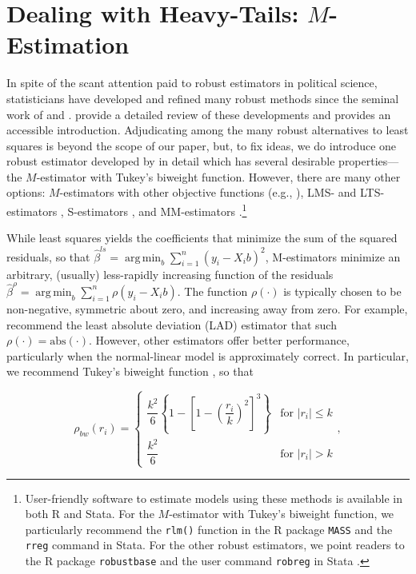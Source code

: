 \documentclass[12pt]{article}
\DeclareMathOperator*{\argmin}{arg\,min}
\begin{document}
\section*{Dealing with Heavy-Tails: $M$-Estimation}

In spite of the scant attention paid to robust estimators in political science, statisticians have developed and refined many robust methods since the seminal work of \cite{Box1953} and \cite{Huber1964}. 
\cite{HuberRonchetti2009} provide a detailed review of these developments and \cite{Anderson2008} provides an accessible introduction. 
Adjudicating among the many robust alternatives to least squares is beyond the scope of our paper, but, to fix ideas, we do introduce one robust estimator developed by \cite{BeatonTukey1974} in detail which has several desirable properties---the $M$-estimator with Tukey's biweight function. 
However, there are many other options: $M$-estimators with other objective functions (e.g., \citealt{Huber1973}), LMS- and LTS-estimators \citep{Rousseeuw1984}, S-estimators \citep{RousseeuwYohai1984}, and MM-estimators \citep{Yohai1987}.\footnote{User-friendly software to estimate models using these methods is available in both R and Stata. For the $M$-estimator with Tukey's biweight function, we particularly recommend the \texttt{rlm()} function in the R package \texttt{MASS} \citep{MASS} and the \texttt{rreg} command in Stata. For the other robust estimators, we point readers to the R package \texttt{robustbase} \citep{Rousseeuwetal2016} and the user command \texttt{robreg} in Stata \citep{Jann2010}.}

While least squares yields the coefficients that minimize the sum of the squared residuals, so that $\hat{\beta}^{ls} =\argmin_{b} \sum_{i = 1}^n (y_i - X_ib)^2$, M-estimators minimize an arbitrary, (usually) less-rapidly increasing function of the residuals $\hat{\beta}^{\rho} =\argmin_{b} \sum_{i = 1}^n \rho(y_i - X_ib)$. 
The function $\rho(\cdot)$ is typically chosen to be non-negative, symmetric about zero, and increasing away from zero. 
For example, \cite{HardenDesmarais2011} recommend the least absolute deviation (LAD) estimator \citep{Dodge1987} that such $\rho(\cdot) = \text{abs}(\cdot)$. 
However, other estimators offer better performance, particularly when the normal-linear model is approximately correct. 
In particular, we recommend Tukey's biweight function \citep{BeatonTukey1974}, so that

\begin{equation}
   \rho_{bw}(r_i) = \begin{cases}
     \dfrac{k^2}{6}\left\{ 1 - \left[ 1 - \left( \dfrac{r_i}{k} \right)^2 \right]^3\right\} & \text{for } |r_i| \leq k\\
        \dfrac{k^2}{6} & \text{for } |r_i| > k 
  \end{cases},
\end{equation}
\end{document}
